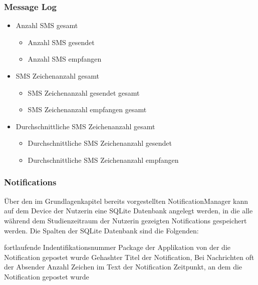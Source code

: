 \subsubsection{Message Log}

\begin{itemize}
    \item Anzahl SMS gesamt
    \begin{itemize}
        \item Anzahl SMS gesendet
        \item Anzahl SMS empfangen
    \end{itemize}

    \item SMS Zeichenanzahl gesamt
    \begin{itemize}
        \item SMS Zeichenanzahl gesendet gesamt
        \item SMS Zeichenanzahl empfangen gesamt
    \end{itemize}

    \item Durchschnittliche SMS Zeichenanzahl gesamt
    \begin{itemize}
        \item Durchschnittliche SMS Zeichenanzahl gesendet
        \item Durchschnittliche SMS Zeichenanzahl empfangen
    \end{itemize}

\end{itemize}


\subsubsection{Notifications}


Über den im Grundlagenkapitel bereits vorgestellten NotificationManager kann auf dem Device der Nutzerin eine SQLite Datenbank angelegt werden,
in die alle während dem Studienzeitraum der Nutzerin gezeigten Notifications gespeichert werden.
Die Spalten der SQLite Datenbank sind die Folgenden:
\begin{requirements}
    \req [\_id] fortlaufende Indentifikationsnummer
    \req [notificationEntry] Package der Applikation von der die Notification gepostet wurde
    \req [titleHashed] Gehashter Titel der Notification, Bei Nachrichten oft der Absender
    \req [textLength] Anzahl Zeichen im Text der Notification
    \req [date] Zeitpunkt, an dem die Notification gepostet wurde
\end{requirements}

